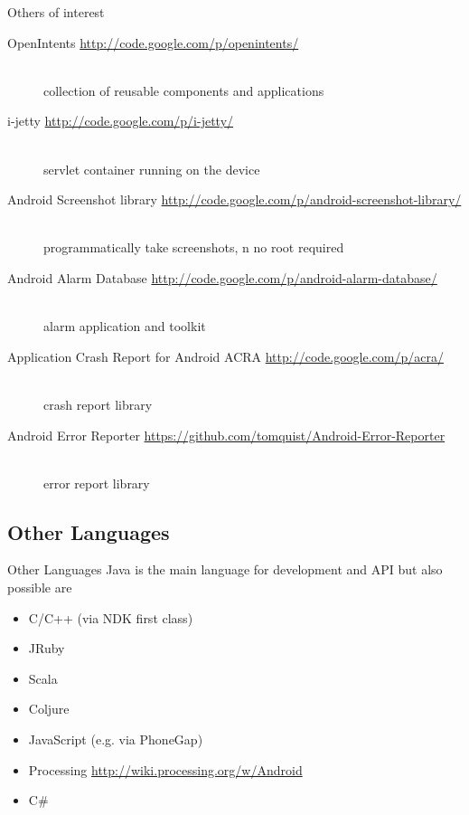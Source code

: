 \documentclass[aspectratio=169]{beamer}
\newcommand{\surl}[1] {{\tiny \url{#1}}}
\begin{document}
    \begin{frame}{Others of interest}
      \begin{description}
        \item[OpenIntents \surl{http://code.google.com/p/openintents/}] \hfill \\ collection of reusable components and applications
        \item[i-jetty \surl{http://code.google.com/p/i-jetty/}] \hfill \\ servlet container running on the device 
        \item[Android Screenshot library \surl{http://code.google.com/p/android-screenshot-library/}] \hfill \\  programmatically take screenshots, n no root required 
        \item[Android Alarm Database \surl{http://code.google.com/p/android-alarm-database/}] \hfill \\ alarm application and toolkit 
        \item[Application Crash Report for Android ACRA \surl{http://code.google.com/p/acra/}] \hfill \\ crash report library
        \item[Android Error Reporter \surl{https://github.com/tomquist/Android-Error-Reporter}] \hfill \\ error report library
      \end{description}
    \end{frame}

  \subsection{Other Languages}
    \begin{frame}{Other Languages}
      Java is the main language for development and API but also possible are 
      \begin{itemize}
      \item C/C++ (via NDK first class)
      \item JRuby
      \item Scala
      \item Coljure
      \item JavaScript (e.g. via PhoneGap)
      \item Processing \surl{http://wiki.processing.org/w/Android}
      \item C\#
      \end{itemize}
    \end{frame}
\end{document}
